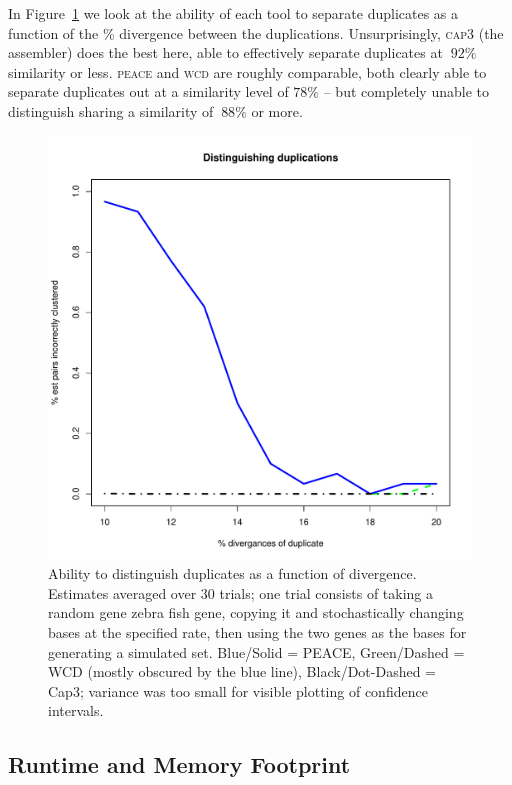 \documentclass[a4paper,12pt]{article}
\newcommand{\peace} {{\small PEACE}}
\newcommand{\wcd} {{\small WCD}}
\newcommand{\capthree} {{\small Cap3}}
\begin{document}
\begin{appendix}
In Figure~\ref{dups} we look at the ability of each tool to separate
duplicates as a function of the \% divergence between the
duplications.  Unsurprisingly, \textsc{cap3} (the assembler) does the best
here, able to effectively separate duplicates at $~92\%$ similarity
or less.  \textsc{peace} and \textsc{wcd} are roughly comparable, both clearly able to
separate duplicates out at a similarity level of $78\%$ -- but completely 
unable to distinguish sharing a similarity of $~88\%$ or more. 

\begin{figure}[tbp]
\centerline{
\includegraphics[scale=0.35]{pics.d/duplicates_40.pdf}
}
\caption{Ability to distinguish duplicates as a function of
  divergence.  Estimates averaged over 30 trials; one trial consists
  of taking a random gene zebra fish gene, copying it and stochastically changing
  bases at the specified rate, then using the two genes as the bases
  for generating a simulated set. Blue/Solid = \peace, Green/Dashed =
  \wcd\/ (mostly obscured by the blue line), Black/Dot-Dashed =
  \capthree; variance was too small for visible plotting of
  confidence intervals.}\label{dups}
\end{figure}

\subsection{Runtime and Memory Footprint}


\end{appendix}
\end{document}
